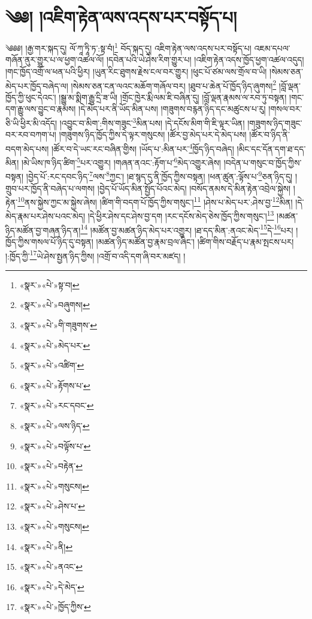 \chapter{༄༅། །འཇིག་རྟེན་ལས་འདས་པར་བསྟོད་པ།}༄༅༅། །རྒྱ་གར་སྐད་དུ། ལོ་ཀཱ་ཏཱི་ཏ་:སྟ་བཾ།\footnote{«སྣར་»«པེ་»སྟ་བ།} བོད་སྐད་དུ། འཇིག་རྟེན་ལས་འདས་པར་བསྟོད་པ། འཇམ་དཔལ་གཞོན་ནུར་གྱུར་པ་ལ་ཕྱག་འཚལ་ལོ། །དབེན་པའི་ཡེ་ཤེས་རིག་གྱུར་པ། །འཇིག་རྟེན་འདས་ཁྱོད་ཕྱག་འཚལ་འདུད། །གང་ཁྱོད་འགྲོ་ལ་ཕན་པའི་ཕྱིར། །ཡུན་རིང་ཐུགས་རྗེས་ངལ་བར་གྱུར། །ཕུང་པོ་ཙམ་ལས་གྲོལ་བ་ཡི། །སེམས་ཅན་མེད་པར་ཁྱོད་བཞེད་ལ། །སེམས་ཅན་ངན་ལའང་མཆོག་གཞོལ་བར། །ཐུབ་པ་ཆེན་པོ་ཁྱོད་ཉིད་ཞུགས།\footnote{«སྣར་»«པེ་»བཞུགས།} །བློ་ལྡན་ཁྱོད་ཀྱི་ཕུང་དེའང་། །སྒྱུ་མ་སྨིག་རྒྱུ་དྲི་ཟ་ཡི། །གྲོང་ཁྱེར་རྨི་ལམ་ཇི་བཞིན་དུ། །བློ་ལྡན་རྣམས་ལ་རབ་ཏུ་བསྟན། །གང་དག་རྒྱུ་ལས་བྱུང་བ་རྣམས། །དེ་མེད་པར་ནི་ཡོད་མིན་པས། །གཟུགས་བརྙན་ཉིད་དང་མཚུངས་པ་རུ། །གསལ་བར་ཅི་ཡི་ཕྱིར་མི་འདོད། །འབྱུང་བ་མིག་:གིས་གཟུང་\footnote{«སྣར་»«པེ་»གི་གཟུགས་}མིན་པས། །དེ་དངོས་མིག་གི་ཇི་ལྟར་ཡིན། །གཟུགས་ཉིད་གཟུང་བར་རབ་བཀག་པ། །གཟུགས་ཉིད་ཁྱོད་ཀྱིས་དེ་ལྟར་གསུངས། །ཚོར་བྱ་མེད་པར་དེ་མེད་པས། །ཚོར་བ་ཉིད་ནི་བདག་མེད་པས། །ཚོར་བ་དེ་ཡང་རང་བཞིན་གྱིས། །ཡོད་པ་:མིན་པར་\footnote{«སྣར་»«པེ་»མེད་པར་}ཁྱོད་ཉིད་བཞེད། །མིང་དང་དོན་དག་ཐ་དད་མིན། །མེ་ཡིས་ཁ་ཉིད་ཚིག་\footnote{«སྣར་»«པེ་»འཚིག་}པར་འགྱུར། །གཞན་ནའང་:རྟོག་པ་\footnote{«སྣར་»«པེ་»རྟོགས་པ་}མེད་འགྱུར་ཞེས། །བདེན་པ་གསུང་བ་ཁྱོད་ཀྱིས་བསྟན། །བྱེད་པོ་:རང་དབང་ཉིད་\footnote{«སྣར་»«པེ་»རང་དབང་}ལས་\footnote{«སྣར་»«པེ་»ལས་ཉིད་}ཀྱང་། །ཐ་སྙད་དུ་ནི་ཁྱོད་ཀྱིས་བསྟན། །ཕན་ཚུན་:ལྟོས་པ་\footnote{«སྣར་»«པེ་»བལྟོས་པ་}ཅན་ཉིད་དུ། །གྲུབ་པར་ཁྱོད་ནི་བཞེད་པ་ལགས། །བྱེད་པོ་ཡོད་མིན་སྤྱོད་པོའང་མེད། །བསོད་ནམས་དེ་མིན་རྟེན་འབྲེལ་སྐྱེས། །རྟེན་\footnote{«སྣར་»«པེ་»བརྟེན་}ནས་སྐྱེས་ཀྱང་མ་སྐྱེས་ཞེས། །ཚིག་གི་བདག་པོ་ཁྱོད་ཀྱིས་གསུང་།\footnote{«སྣར་»«པེ་»གསུངས།} །ཤེས་པ་མེད་པར་:ཤེས་བྱ་\footnote{«སྣར་»«པེ་»ཤེས་པ་}མིན། །དེ་མེད་རྣམ་པར་ཤེས་པའང་མེད། །དེ་ཕྱིར་ཤེས་དང་ཤེས་བྱ་དག །རང་དངོས་མེད་ཅེས་ཁྱོད་ཀྱིས་གསུང་།\footnote{«སྣར་»«པེ་»གསུངས།} །མཚན་ཉིད་མཚོན་བྱ་གཞན་ཉིད་ན།\footnote{«སྣར་»«པེ་»ནི།} །མཚོན་བྱ་མཚན་ཉིད་མེད་པར་འགྱུར། །ཐ་དད་མིན་:ནའང་མེད་\footnote{«སྣར་»«པེ་»ནའང་}དེ་\footnote{«སྣར་»«པེ་»དེ་མེད་}པར། །ཁྱོད་ཀྱིས་གསལ་པོ་ཉིད་དུ་བསྟན། །མཚན་ཉིད་མཚོན་བྱ་རྣམ་བྲལ་ཞིང་། །ཚིག་གིས་བརྗོད་པ་རྣམ་སྤངས་པར། །:ཁྱོད་ཀྱི་\footnote{«སྣར་»«པེ་»ཁྱོད་ཀྱིས་}ཡེ་ཤེས་སྤྱན་ཉིད་ཀྱིས། །འགྲོ་བ་འདི་དག་ཞི་བར་མཛད། །

